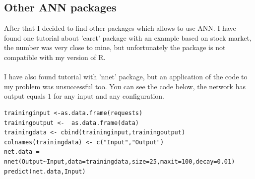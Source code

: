 \documentclass[english]{article}
\begin{document}
\subsection{Other ANN packages}
After that I decided to find other packages which allows to use ANN. I have found one tutorial about 'caret' package with an example based on stock market, the number was very close to mine, but unfortunately the package is not compatible with my version of R.\\\\
I have also found tutorial with 'nnet' package, but an application of the code to my problem was unsuccessful too. You can see the code below, the network has output equals 1 for any input and any configuration.
\begin{lstlisting}
traininginput <-as.data.frame(requests)
trainingoutput <-  as.data.frame(data)
trainingdata <- cbind(traininginput,trainingoutput) 
colnames(trainingdata) <- c("Input","Output")
net.data = nnet(Output~Input,data=trainingdata,size=25,maxit=100,decay=0.01)
predict(net.data,Input)
\end{lstlisting}
\end{document}
